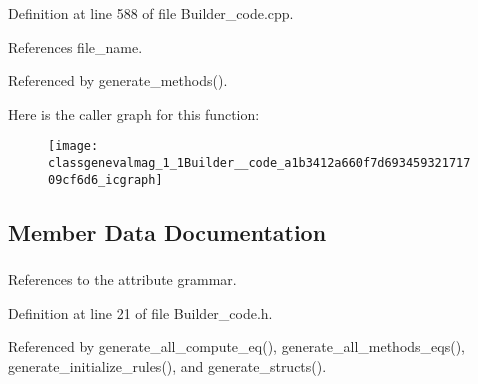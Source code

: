 Definition at line 588 of file Builder\_\-code.cpp.



References file\_\-name.



Referenced by generate\_\-methods().



Here is the caller graph for this function:\nopagebreak
\begin{figure}[H]
\begin{center}
\leavevmode
\texttt{[image: classgenevalmag\_1\_1Builder\_\_code\_a1b3412a660f7d69345932171709cf6d6\_icgraph]}
\end{center}
\end{figure}




\subsection{Member Data Documentation}
\hypertarget{classgenevalmag_1_1Builder__code_a94e3c41b0c77596acfb34c731c17f001}{
\subsubsection[{attr\_\-grammar}]{}}
\label{classgenevalmag_1_1Builder__code_a94e3c41b0c77596acfb34c731c17f001}


References to the attribute grammar. 



Definition at line 21 of file Builder\_\-code.h.



Referenced by generate\_\-all\_\-compute\_\-eq(), generate\_\-all\_\-methods\_\-eqs(), generate\_\-initialize\_\-rules(), and generate\_\-structs().

\hypertarget{classgenevalmag_1_1Builder__code_aba5b99353b3ec17c3b788c7baa2ae4ce}{
\subsubsection[{b\_\-plans}]{}}
\label{classgenevalmag_1_1Builder__code_aba5b99353b3ec17c3b788c7baa2ae4ce}


